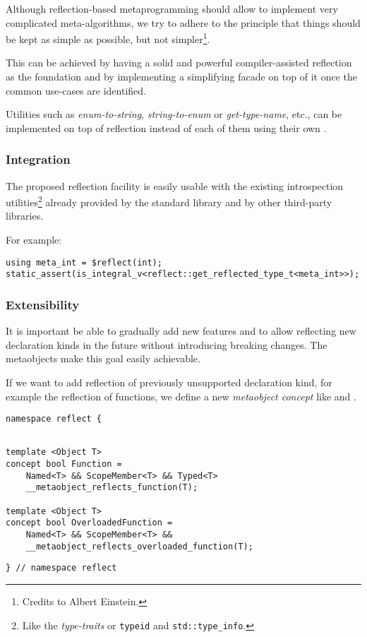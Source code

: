 Although reflection-based metaprogramming should allow to implement very
complicated meta-algorithms, we try to adhere to the principle that things
should be kept as simple as possible, but not simpler\footnote{Credits to
Albert Einstein.}.

This can be achieved by having a solid and powerful compiler-assisted reflection
as the foundation and by implementing a simplifying facade on top of it once
the common use-cases are identified.

Utilities such as {\em enum-to-string}, {\em string-to-enum} or {\em get-type-name},
etc., can be implemented on top of reflection instead of each of them using their own
.

\subsubsection{Integration}
\label{design-integration}

The proposed reflection facility is easily
usable with the existing introspection utilities\footnote{Like the
{\em type-traits} or \texttt{typeid} and \texttt{std::type\_info}.}
already provided by the standard library and by other third-party libraries.

For example:

\begin{verbatim}
using meta_int = $reflect(int);
static_assert(is_integral_v<reflect::get_reflected_type_t<meta_int>>);
\end{verbatim}

\subsubsection{Extensibility}
\label{design-extensibility}

It is important be able to gradually add new features and to allow
reflecting new declaration kinds in the future without introducing breaking changes.
The metaobjects make this goal easily achievable.

If we want to add reflection of previously unsupported declaration kind, for example
the reflection of functions, we define a new {\em metaobject concept} like
 and .

\begin{verbatim}
namespace reflect {
\end{verbatim}
\begin{verbatim}

template <Object T>
concept bool Function = 
	Named<T> && ScopeMember<T> && Typed<T>
	__metaobject_reflects_function(T);

template <Object T>
concept bool OverloadedFunction =
	Named<T> && ScopeMember<T> &&
	__metaobject_reflects_overloaded_function(T);

\end{verbatim}
\begin{verbatim}
} // namespace reflect
\end{verbatim}

